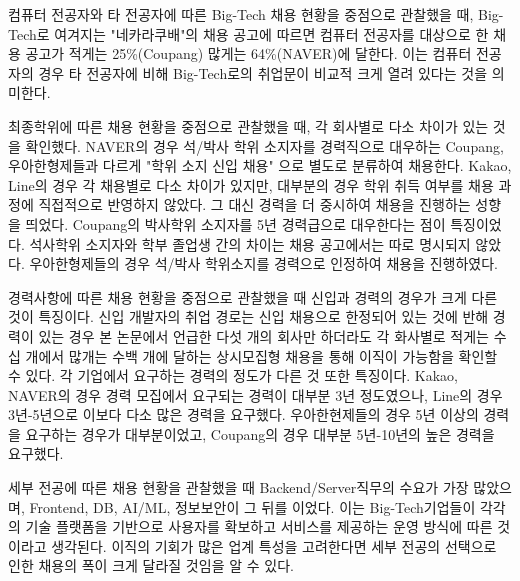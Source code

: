 \documentclass{pnu-survey}
\begin{document}
 컴퓨터 전공자와 타 전공자에 따른 Big-Tech 채용 현황을 중점으로 관찰했을 때, Big-Tech로 여겨지는 "네카라쿠배"의 채용 공고에 따르면 컴퓨터 전공자를 대상으로 한 채용 공고가 적게는 25\%(Coupang) 많게는 64\%(NAVER)에 달한다. 이는 컴퓨터 전공자의 경우 타 전공자에 비해 Big-Tech로의 취업문이 비교적 크게 열려 있다는 것을 의미한다.

 최종학위에 따른 채용 현황을 중점으로 관찰했을 때, 각 회사별로 다소 차이가 있는 것을 확인했다. NAVER의 경우 석/박사 학위 소지자를 경력직으로 대우하는 Coupang, 우아한형제들과 다르게 "학위 소지 신입 채용" 으로 별도로 분류하여 채용한다. Kakao, Line의 경우 각 채용별로 다소 차이가 있지만, 대부분의 경우 학위 취득 여부를 채용 과정에 직접적으로 반영하지 않았다. 그 대신 경력을 더 중시하여 채용을 진행하는 성향을 띄었다. Coupang의 박사학위 소지자를 5년 경력급으로 대우한다는 점이 특징이었다. 석사학위 소지자와 학부 졸업생 간의 차이는 채용 공고에서는 따로 명시되지 않았다. 우아한형제들의 경우 석/박사 학위소지를 경력으로 인정하여 채용을 진행하였다.

경력사항에 따른 채용 현황을 중점으로 관찰했을 때 신입과 경력의 경우가 크게 다른 것이 특징이다. 신입 개발자의 취업 경로는 신입 채용으로 한정되어 있는 것에 반해 경력이 있는 경우 본 논문에서 언급한 다섯 개의 회사만 하더라도 각 화사별로 적게는 수십 개에서 많개는 수백 개에 달하는 상시모집형 채용을 통해 이직이 가능함을 확인할 수 있다. 각 기업에서 요구하는 경력의 정도가 다른 것 또한 특징이다. Kakao, NAVER의 경우 경력 모집에서 요구되는 경력이 대부분 3년 정도였으나, Line의 경우 3년-5년으로 이보다 다소 많은 경력을 요구했다. 우아한현제들의 경우 5년 이상의 경력을 요구하는 경우가 대부분이었고, Coupang의 경우 대부분 5년-10년의 높은 경력을 요구했다.

세부 전공에 따른 채용 현황을 관찰했을 때 Backend/Server직무의 수요가 가장 많았으며, Frontend, DB, AI/ML, 정보보안이 그 뒤를 이었다. 이는 Big-Tech기업들이 각각의 기술 플랫폼을 기반으로 사용자를 확보하고 서비스를 제공하는 운영 방식에 따른 것이라고 생각된다. 이직의 기회가 많은 업계 특성을 고려한다면 세부 전공의 선택으로 인한 채용의 폭이 크게 달라질 것임을 알 수 있다.



\theendnotes{}
\end{document}
